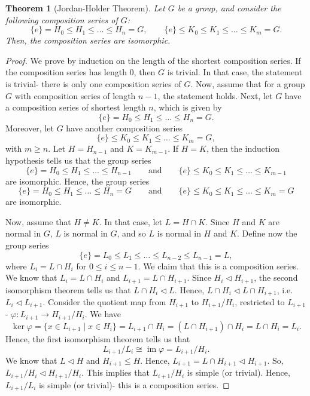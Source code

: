 \documentclass[a4paper, openany]{memoir}
\theoremstyle{definition}
\theoremstyle{plain}
\newtheorem{theorem}[definition]{Theorem}
\begin{document}
    \begin{theorem}[Jordan-Holder Theorem]
        Let $G$ be a group, and consider the following composition series of $G$:
        \[\{e\} = H_0 \leq H_1 \leq \dots \leq H_n = G, \qquad \{e\} \leq K_0 \leq K_1 \leq \dots \leq K_m = G.\]
        Then, the composition series are isomorphic. 
    \end{theorem}
    \begin{proof}
        We prove by induction on the length of the shortest composition series. If the composition series has length 0, then $G$ is trivial. In that case, the statement is trivial- there is only one composition series of $G$. Now, assume that for a group $G$ with composition series of length $n-1$, the statement holds. Next, let $G$ have a composition series of shortest length $n$, which is given by
        \[\{e\} = H_0 \leq H_1 \leq \dots \leq H_n = G.\]
        Moreover, let $G$ have another composition series
        \[\{e\} \leq K_0 \leq K_1 \leq \dots \leq K_m = G,\]
        with $m \geq n$. Let $H = H_{n-1}$ and $K = K_{m-1}$. If $H = K$, then the induction hypothesis tells us that the group series
        \[\{e\} = H_0 \leq H_1 \leq \dots \leq H_{n-1} \qquad \text{and} \qquad \{e\} \leq K_0 \leq K_1 \leq \dots \leq K_{m-1}\]
        are isomorphic. Hence, the group series
        \[\{e\} = H_0 \leq H_1 \leq \dots \leq H_n = G \qquad \text{and} \qquad \{e\} \leq K_0 \leq K_1 \leq \dots \leq K_m = G\]
        are isomorphic.

        Now, assume that $H \neq K$. In that case, let $L = H \cap K$. Since $H$ and $K$ are normal in $G$, $L$ is normal in $G$, and so $L$ is normal in $H$ and $K$. Define now the group series
        \[\{e\} = L_0 \leq L_1 \leq \dots \leq L_{n-2} \leq L_{n-1} = L,\]
        where $L_i = L \cap H_i$ for $0 \leq i \leq n-1$. We claim that this is a composition series. We know that $L_i = L \cap H_i$ and $L_{i+1} = L \cap H_{i+1}$. Since $H_i \vartriangleleft H_{i+1}$, the second isomorphism theorem tells us that $L \cap H_i \vartriangleleft L$. Hence, $L \cap H_i \vartriangleleft L \cap H_{i+1}$, i.e. $L_i \vartriangleleft L_{i+1}$. Consider the quotient map from $H_{i+1}$ to $H_{i+1}/H_i$, restricted to $L_{i+1}$- $\varphi\colon L_{i+1} \to H_{i+1}/H_i$. We have 
        \[\ker \varphi = \{x \in L_{i+1} \mid x \in H_i\} = L_{i+1} \cap H_i = (L \cap H_{i+1}) \cap H_i = L \cap H_i = L_i.\]
        Hence, the first isomorphism theorem tells us that
        \[L_{i+1}/L_i \cong \operatorname{im} \varphi = L_{i+1}/H_i.\]
        We know that $L \vartriangleleft H$ and $H_{i+1} \leq H$. Hence, $L_{i+1} = L \cap H_{i+1} \vartriangleleft H_{i+1}$. So, $L_{i+1}/H_i \vartriangleleft H_{i+1}/H_i$. This implies that $L_{i+1}/H_i$ is simple (or trivial). Hence, $L_{i+1}/L_i$ is simple (or trivial)- this is a composition series.


\end{proof}
\end{document}
